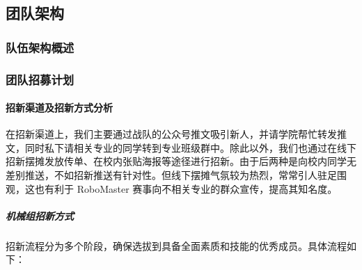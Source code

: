 \subsection{团队架构}

    \subsubsection{队伍架构概述}
    
        \noindent

        \noindent

    \subsubsection{团队招募计划}

        \paragraph{招新渠道及招新方式分析}

            在招新渠道上，我们主要通过战队的公众号推文吸引新人，并请学院帮忙转发推文，同时私下请相关专业的同学转到专业班级群中。除此以外，我们也通过在线下招新摆摊发放传单、在校内张贴海报等途径进行招新。由于后两种是向校内同学无差别推送，不如招新推送有针对性。但线下摆摊气氛较为热烈，常常引人驻足围观，这也有利于 RoboMaster 赛事向不相关专业的群众宣传，提高其知名度。\par

            \subparagraph{机械组招新方式}

                招新流程分为多个阶段，确保选拔到具备全面素质和技能的优秀成员。具体流程如下：


